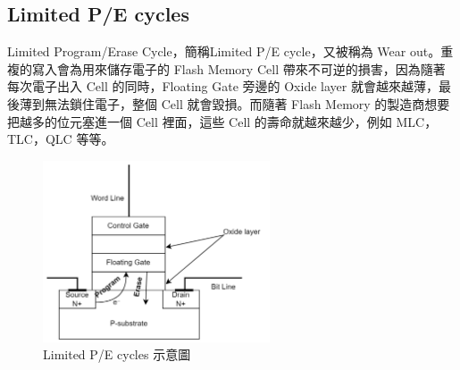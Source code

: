 \subsection{Limited P/E cycles}\label{s2.1.4}
\indent
Limited Program/Erase Cycle，簡稱Limited P/E cycle，又被稱為 Wear out。重複的寫入會為用來儲存電子的 Flash Memory Cell 帶來不可逆的損害，因為隨著每次電子出入 Cell 的同時，Floating Gate 旁邊的 Oxide layer 就會越來越薄，最後薄到無法鎖住電子，整個 Cell 就會毀損\cite{8631191}。而隨著 Flash Memory 的製造商想要把越多的位元塞進一個 Cell 裡面，這些 Cell 的壽命就越來越少，例如 MLC，TLC，QLC 等等。
\begin{figure}[H]
    \centering
    \includegraphics[width=0.6\textwidth]{picture/ch2/Limited_P-E_Cycles.png}
    \caption{Limited P/E cycles 示意圖}
    \label{f2.3}
\end{figure}

